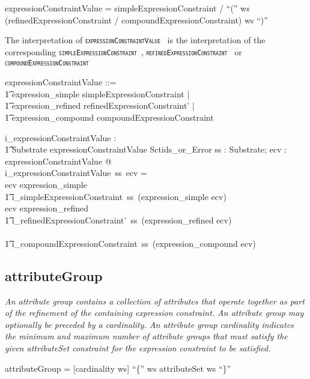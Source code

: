 \documentclass{article}
\def\spec#1{{\tt \small \textsc{{#1}} }}
\def\bnf#1{{\scriptsize {{#1}} }}
\def\desc#1{{\small \textsl{{#1}} }}
\begin{document}
\begin{framed}
\noindent
\bnf{expressionConstraintValue = simpleExpressionConstraint / ``('' ws (refinedExpressionConstraint / compoundExpressionConstraint) ws ``)''}
\end{framed}

The interpretation of \spec{expressionConstraintValue} is the interpretation of the corresponding \spec{simpleExpressionConstraint}, \spec{refinedExpressionConstraint} or
\spec{compoundExpressionConstraint}

\begin{zed}
expressionConstraintValue ::= \\
\t1 expression\_simple \ldata simpleExpressionConstraint \rdata | \\
\t1 expression\_refined \ldata refinedExpressionConstraint' \rdata | \\
\t1 expression\_compound \ldata compoundExpressionConstraint \rdata
\end{zed}

\begin{axdef}
   i\_expressionConstraintValue : \\
\t1 Substrate \fun expressionConstraintValue \fun Sctids\_or\_Error
\where
   \forall ss : Substrate; ecv : expressionConstraintValue @ \\
   i\_expressionConstraintValue~ss~ecv = \\
\IF ecv \in \ran expression\_simple  \THEN \\
\t1 i\_simpleExpressionConstraint~ss~(expression\_simple \inv ecv) \\
\ELSE \IF ecv \in \ran expression\_refined \THEN \\
\t1 i\_refinedExpressionConstraint'~ss~(expression\_refined \inv ecv) \\
\ELSE \\
\t1 i\_compoundExpressionConstraint~ss~(expression\_compound \inv ecv)
\end{axdef}



\subsection{attributeGroup}
\begin{framed}
\desc{An attribute group contains a collection of attributes that operate together as part of the refinement of the containing expression constraint. An attribute group may optionally be preceded by a cardinality. An attribute group cardinality indicates the minimum and maximum number of attribute groups that must satisfy the given attributeSet constraint for the expression constraint to be satisfied.}
\end{framed}
\begin{framed}
\noindent
\bnf{attributeGroup = [cardinality ws] ``\{'' ws attributeSet ws ``\}''}
\end{framed}
\end{document}
